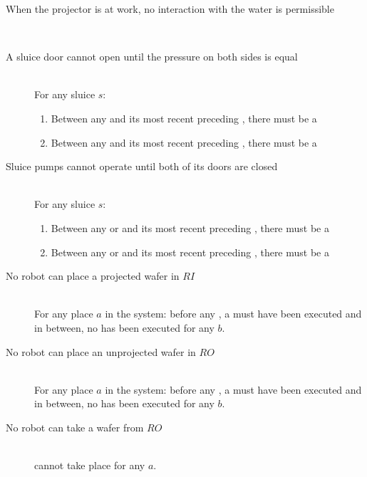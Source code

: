 \begin{description}
 \item[When the projector is at work, no interaction with the water is permissible] \hfill \\
 
 
 
 \item[A sluice door cannot open until the pressure on both sides is equal] \hfill \\
 For any sluice $s$:
 \begin{enumerate}
  \item Between any  and its most recent preceding , there must be a 
  \item Between any  and its most recent preceding , there must be a 
 \end{enumerate}

 \item[Sluice pumps cannot operate until both of its doors are closed] \hfill \\
 For any sluice $s$:
 \begin{enumerate}
  \item Between any  or  and its most recent preceding , there must be a 
  \item Between any  or  and its most recent preceding , there must be a 
 \end{enumerate}

\item[No robot can place a projected wafer in $RI$] \hfill \\
For any place $a$ in the system: before any , a  must have been executed and in between, no  has been executed for any $b$.

\item[No robot can place an unprojected wafer in $RO$] \hfill \\
For any place $a$ in the system: before any , a  must have been executed and in between, no  has been executed for any $b$.

\item[No robot can take a wafer from $RO$] \hfill \\
 cannot take place for any $a$.
 
\end{description}
